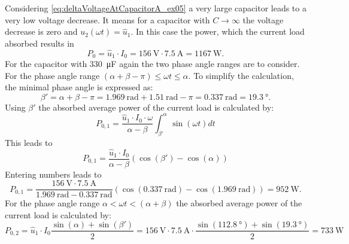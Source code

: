 \begin{solutionblock}
    Considering \eqref{eq:deltaVoltageAtCapacitorA_ex05} a very large capacitor leads to a very low voltage decrease. It means for
    a capacitor with $C\rightarrow \infty$ the voltage decrease is zero and $u_\mathrm{2}(\omega t)=\hat{u}_\mathrm{1}$. 
    In this case the power, which the current load absorbed results in
    \begin{equation} 
        P_\mathrm{0}=\hat{u}_\mathrm{1} \cdot I_{\mathrm{0}}=\SI{156}{\volt}\cdot\SI{7.5}{\ampere}=\SI{1167}{\watt}.
    \end{equation}
    For the capacitor with \SI{330}{\micro\farad} again the two phase angle ranges are to consider. For the phase angle range
    $(\alpha+\beta-\pi)\leq\omega t\leq\alpha$. To simplify the calculation, the minimal phase angle is expressed as:
    \begin{equation} 
        \beta'=\alpha+\beta-\pi=\SI{1.969}{\radian}+\SI{1.51}{\radian}-\pi
        =\SI{0.337}{\radian} = \SI{19.3}{\degree}.
    \end{equation}
    Using $\beta'$ the absorbed average power of the current load is calculated by:
    \begin{equation} 
        P_\mathrm{0,1}=\frac{\hat{u}_\mathrm{1} \cdot I_{\mathrm{0}} \cdot \omega}{\alpha-\beta} \int_{\beta'}^{\alpha} \sin(\omega t) dt
    \end{equation}
    This leads to
    \begin{equation} 
        P_\mathrm{0,1}=\frac{\hat{u}_\mathrm{1} \cdot I_{\mathrm{0}}}{\alpha-\beta} \left( \cos(\beta') - \cos(\alpha) \right)
    \end{equation}
    Entering numbers leads to
    \begin{equation} 
        P_\mathrm{0,1}=\frac{\SI{156}{\volt} \cdot \SI{7.5}{\ampere}}{\SI{1.969}{\radian}-\SI{0.337}{\radian}}
         \left( \cos(\SI{0.337}{\radian}) - \cos(\SI{1.969}{\radian}) \right)=\SI{952}{\watt}.
    \end{equation}
    For the phase angle range $\alpha<\omega t<(\alpha+\beta)$ the absorbed average power of the current load is calculated by:
    \begin{equation} 
        P_\mathrm{0,2}=\hat{u}_\mathrm{1} \cdot I_{\mathrm{0}} \frac{\sin(\alpha) + \sin(\beta')}{2}=
        \SI{156}{\volt} \cdot \SI{7.5}{\ampere} \cdot \frac{\sin(\SI{112.8}{\degree}) + \sin(\SI{19.3}{\degree})}{2}=
        \SI{733}{\watt}
    \end{equation}

\end{solutionblock}

